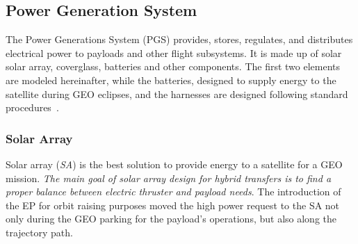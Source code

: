 \subsection{Power Generation System}
\label{subsec:pgs}
The Power Generations System (PGS) provides, stores, regulates, and distributes electrical power to payloads and other flight subsystems. It is made up of solar solar array, coverglass, batteries and other components. The first two elements are modeled hereinafter, while the batteries, designed to supply energy to the satellite during GEO eclipses, and the harnesses are designed following  standard procedures~\cite{wertz2011space,tesisimo}.
\subsubsection{Solar Array}
\label{subsubsec:solararray}
Solar array (\textit{SA}) is the best solution to provide energy to a satellite for a GEO mission. \emph{The main goal of solar array design for hybrid transfers is to find a proper balance between electric thruster and payload needs}. The introduction of the EP for orbit raising purposes moved the high power request to the SA not only during the GEO parking for the payload's operations, but also along the trajectory path.

